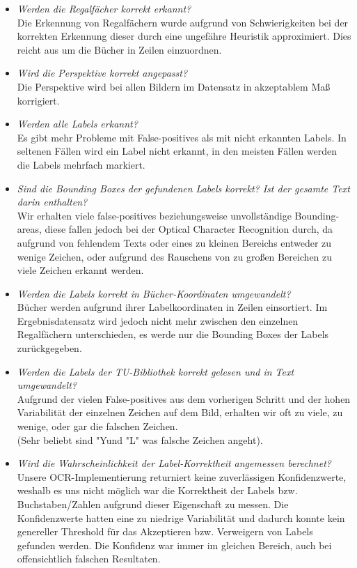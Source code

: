 \documentclass[paper=A4, deutsch]{scrartcl}
\begin{document}
\begin{itemize}
	\item \textit{Werden die Regalfächer korrekt erkannt?}\\
		  Die Erkennung von Regalfächern wurde aufgrund von Schwierigkeiten bei der korrekten Erkennung dieser durch eine ungefähre Heuristik approximiert. Dies reicht aus um die Bücher in Zeilen einzuordnen.
		  
	\item \textit{Wird die Perspektive korrekt angepasst?}\\
		  Die Perspektive wird bei allen Bildern im Datensatz in akzeptablem Maß korrigiert.
		  
	\item \textit{Werden alle Labels erkannt?}\\
		  Es gibt mehr Probleme mit False-positives als mit nicht erkannten Labels. In seltenen Fällen wird ein Label nicht  erkannt, in den meisten Fällen werden die Labels mehrfach markiert.
		  
	\item \textit{Sind die Bounding Boxes der gefundenen Labels korrekt? Ist der gesamte Text darin enthalten?}\\
		  Wir erhalten viele false-positives beziehungsweise unvollständige Bounding-areas, diese fallen jedoch bei der Optical Character Recognition durch, da aufgrund von fehlendem Texts oder eines zu kleinen Bereichs entweder zu wenige Zeichen, oder aufgrund des Rauschens von zu großen Bereichen zu viele Zeichen erkannt werden.
		  
	\item \textit{Werden die Labels korrekt in Bücher-Koordinaten umgewandelt?}\\
		  Bücher werden aufgrund ihrer Labelkoordinaten in Zeilen einsortiert. Im Ergebnisdatensatz wird jedoch nicht mehr zwischen den einzelnen Regalfächern unterschieden, es werde nur die Bounding Boxes der Labels zurückgegeben.
		  
	\item \textit{Werden die Labels der TU-Bibliothek korrekt gelesen und in Text umgewandelt?}\\
		  Aufgrund der vielen False-positives aus dem vorherigen Schritt und der hohen Variabilität der einzelnen Zeichen auf dem Bild, erhalten wir oft zu viele, zu wenige, oder gar die falschen Zeichen.\\(Sehr beliebt sind "Y\dq  und "L" was falsche Zeichen angeht).
		  
	\item \textit{Wird die Wahrscheinlichkeit der Label-Korrektheit angemessen berechnet?}\\
		  Unsere OCR-Implementierung returniert keine zuverlässigen Konfidenzwerte, weshalb es uns nicht möglich war die Korrektheit der Labels bzw. Buchstaben/Zahlen aufgrund dieser Eigenschaft zu messen. Die Konfidenzwerte hatten eine zu niedrige Variabilität und dadurch konnte kein genereller Threshold für das Akzeptieren bzw. Verweigern von Labels gefunden werden. Die Konfidenz war immer im gleichen Bereich, auch bei offensichtlich falschen Resultaten.
		  
\end{itemize}
\end{document}

